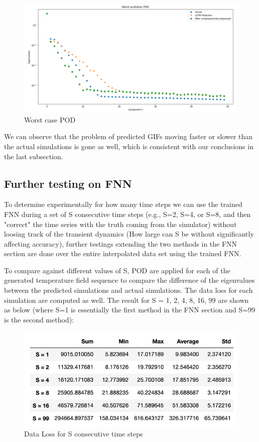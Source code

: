 \begin{figure}[H]
    \caption{Worst case POD}
    \includegraphics[scale=0.5]{figures/mantle_convection_images/larger_dataset_interpolated/LSTM_Worst_POD.png}
\end{figure}


We can observe that the problem of predicted GIFs moving faster or slower than the actual simulations is gone as well, which is consistent with our conclusions in the last subsection.


\subsection{Further testing on FNN}

To determine experimentally for how many time steps we can use the trained FNN during a set of S consecutive time steps (e.g., S=2, S=4, or S=8, and then "correct" the time series with the truth coming from the simulator) without loosing track of the transient dynamics (How large can S be without significantly affecting accuracy), further testings extending the two methods in the FNN section are done over the entire interpolated data set using the trained FNN.

To compare against different values of S, POD are applied for each of the generated temperature field sequence to compare the difference of the eigenvalues between the predicted simulations and actual simulations. The data loss for each simulation are computed as well. The result for S = 1, 2, 4, 8, 16, 99 are shown as below (where S=1 is essentially the first method in the FNN section and S=99 is the second method):

\begin{figure}[H]
    \caption{Data Loss for S consecutive time steps}
    \includegraphics[scale=0.7]{figures/mantle_convection_images/further_testings/Data_Loss_table.png}
\end{figure}

